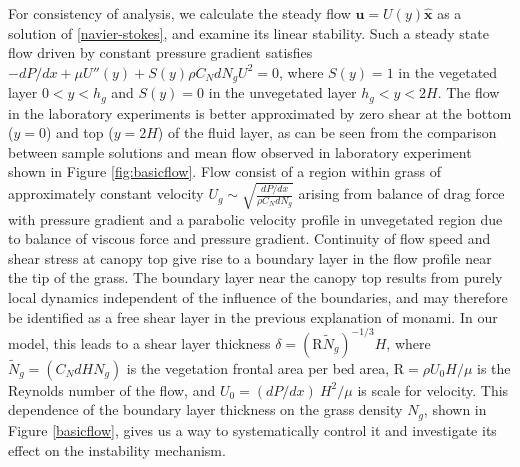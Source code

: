 \documentclass[aps,prl,reprint,twocolumn,showpacs,superscriptaddress,10pt]{revtex4-1}  %
\newcommand{\bu}{\mathbf{u}}
\newcommand{\hg}{h_g}
\newcommand{\Rey}{\text{R}}
\newcommand{\Ndg}{\tilde{N}_g}
\begin{document}
For consistency of analysis, we calculate the steady flow $\bu = U(y)\boldsymbol{\hat{x}}$ as a solution of \eqref{navier-stokes}, and examine its linear stability. 
Such a steady state flow driven by constant pressure gradient satisfies $-{dP}/{dx}+\mu U''(y) +S(y) \rho C_N d N_gU^2=0$, where $S(y)=1$ in the vegetated layer $0<y<\hg$ and $S(y)=0$ in the unvegetated layer $\hg< y< 2H$.
The flow in the laboratory experiments is better approximated by zero shear at the bottom ($y=0$) and top ($y=2H$) of the fluid layer, as can be seen from the comparison between sample solutions and mean flow observed in laboratory experiment shown in Figure \ref{fig:basicflow}. 
Flow consist of a region within grass of approximately constant velocity $U_g \sim \sqrt{\frac{dP/dx}{\rho C_N dN_g}}$ arising from balance of drag force with pressure gradient and a parabolic velocity profile in unvegetated region due to balance of viscous force and pressure gradient. 
Continuity of flow speed and shear stress at canopy top give rise to a boundary layer in the flow profile near the tip of the grass. 
The boundary layer near the canopy top results from purely local dynamics independent of the influence of the boundaries, and may therefore be identified as a free shear layer\cite{Ghisal02} in the previous explanation of monami. 
In our model, this leads to a shear layer thickness $\delta = (\Rey\Ndg)^{-1/3} H$, where $\Ndg = \left(C_N d H N_g\right)$ is the vegetation frontal area per bed area, $\Rey=\rho U_0 H/\mu$ is the Reynolds number of the flow, and $U_0 = {(dP/dx)~H^2}/{\mu}$ is scale for velocity. 
This dependence of the boundary layer thickness on the grass density $N_g$, shown in Figure \ref{basicflow}, gives us a way to systematically control it and investigate its effect on the instability mechanism. 
\end{document}
